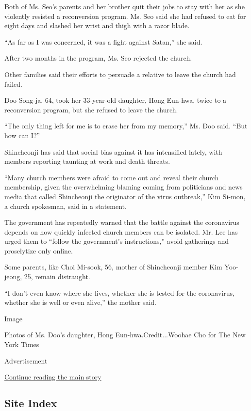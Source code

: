Both of Ms. Seo's parents and her brother quit their jobs to stay with
her as she violently resisted a reconversion program. Ms. Seo said she
had refused to eat for eight days and slashed her wrist and thigh with a
razor blade.

``As far as I was concerned, it was a fight against Satan,'' she said.

After two months in the program, Ms. Seo rejected the church.

Other families said their efforts to persuade a relative to leave the
church had failed.

Doo Song-ja, 64, took her 33-year-old daughter, Hong Eun-hwa, twice to a
reconversion program, but she refused to leave the church.

``The only thing left for me is to erase her from my memory,'' Ms. Doo
said. ``But how can I?''

Shincheonji has said that social bias against it has intensified lately,
with members reporting taunting at work and death threats.

``Many church members were afraid to come out and reveal their church
membership, given the overwhelming blaming coming from politicians and
news media that called Shincheonji the originator of the virus
outbreak,'' Kim Si-mon, a church spokesman, said in a statement.

The government has repeatedly warned that the battle against the
coronavirus depends on how quickly infected church members can be
isolated. Mr. Lee has urged them to ``follow the government's
instructions,'' avoid gatherings and proselytize only online.

Some parents, like Choi Mi-sook, 56, mother of Shincheonji member Kim
Yoo-jeong, 25, remain distraught.

``I don't even know where she lives, whether she is tested for the
coronavirus, whether she is well or even alive,'' the mother said.

Image

Photos of Ms. Doo's daughter, Hong Eun-hwa.Credit...Woohae Cho for The
New York Times

Advertisement

\protect\hyperlink{after-bottom}{Continue reading the main story}

\hypertarget{site-index}{%
\subsection{Site Index}\label{site-index}}

